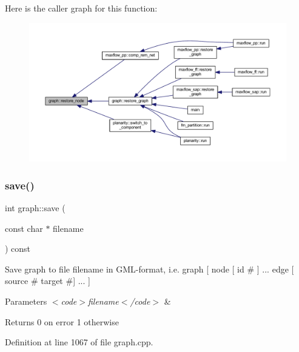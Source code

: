 Here is the caller graph for this function\+:
\nopagebreak
\begin{figure}[H]
\begin{center}
\leavevmode
\includegraphics[width=350pt]{classgraph_ab57aab79e649cc275052b7decbdd03ec_icgraph}
\end{center}
\end{figure}
\mbox{\label{classgraph_a7bd0712a528249d1585085a64ac3e661}} 
\subsubsection{\texorpdfstring{save()}{save()}\hspace{0.1cm}{\footnotesize\ttfamily [1/2]}}
{\footnotesize\ttfamily int graph\+::save (\begin{DoxyParamCaption}\item[{const char $\ast$}]{filename }\end{DoxyParamCaption}) const}

Save graph to file {\ttfamily filename} in G\+M\+L-\/format, i.\+e. {\ttfamily graph \mbox{[} node \mbox{[} id \# \mbox{]} ... edge \mbox{[} source \# target \#\mbox{]} ... \mbox{]}}


\begin{DoxyParams}{Parameters}
{\em $<$code$>$filename$<$/code$>$} & \\
\hline
\end{DoxyParams}
\begin{DoxyReturn}{Returns}
0 on error 1 otherwise 
\end{DoxyReturn}


Definition at line 1067 of file graph.\+cpp.


